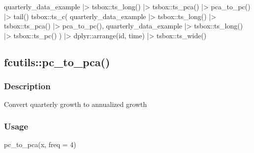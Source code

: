 \documentclass[
  letterpaper,
  DIV=11,
  numbers=noendperiod]{scrreport}
\newenvironment{Shaded}{\begin{snugshade}}{\end{snugshade}}
\newcommand{\AttributeTok}[1]{\textcolor[rgb]{0.40,0.45,0.13}{#1}}
\newcommand{\DecValTok}[1]{\textcolor[rgb]{0.68,0.00,0.00}{#1}}
\newcommand{\FunctionTok}[1]{\textcolor[rgb]{0.28,0.35,0.67}{#1}}
\newcommand{\NormalTok}[1]{\textcolor[rgb]{0.00,0.23,0.31}{#1}}
\newcommand{\SpecialCharTok}[1]{\textcolor[rgb]{0.37,0.37,0.37}{#1}}
\begin{document}
\begin{Shaded}
\begin{Highlighting}[]
\NormalTok{quarterly\_data\_example }\SpecialCharTok{|\textgreater{}}
\NormalTok{  tsbox}\SpecialCharTok{::}\FunctionTok{ts\_long}\NormalTok{() }\SpecialCharTok{|\textgreater{}}
\NormalTok{  tsbox}\SpecialCharTok{::}\FunctionTok{ts\_pca}\NormalTok{() }\SpecialCharTok{|\textgreater{}}
  \FunctionTok{pca\_to\_pc}\NormalTok{() }\SpecialCharTok{|\textgreater{}}
  \FunctionTok{tail}\NormalTok{()}
\NormalTok{tsbox}\SpecialCharTok{::}\FunctionTok{ts\_c}\NormalTok{(}
\NormalTok{  quarterly\_data\_example }\SpecialCharTok{|\textgreater{}}
\NormalTok{    tsbox}\SpecialCharTok{::}\FunctionTok{ts\_long}\NormalTok{() }\SpecialCharTok{|\textgreater{}}
\NormalTok{    tsbox}\SpecialCharTok{::}\FunctionTok{ts\_pca}\NormalTok{() }\SpecialCharTok{|\textgreater{}}
    \FunctionTok{pca\_to\_pc}\NormalTok{(),}
\NormalTok{  quarterly\_data\_example }\SpecialCharTok{|\textgreater{}}
\NormalTok{    tsbox}\SpecialCharTok{::}\FunctionTok{ts\_long}\NormalTok{() }\SpecialCharTok{|\textgreater{}}
\NormalTok{    tsbox}\SpecialCharTok{::}\FunctionTok{ts\_pc}\NormalTok{()}
\NormalTok{) }\SpecialCharTok{|\textgreater{}}
\NormalTok{  dplyr}\SpecialCharTok{::}\FunctionTok{arrange}\NormalTok{(id, time) }\SpecialCharTok{|\textgreater{}}
\NormalTok{  tsbox}\SpecialCharTok{::}\FunctionTok{ts\_wide}\NormalTok{()}
\end{Highlighting}
\end{Shaded}

\subsection{fcutils::pc\_to\_pca()}\label{fcutilspc_to_pca}

\subsubsection{Description}\label{description-46}

Convert quarterly growth to annualized growth

\subsubsection{Usage}\label{usage-46}

\begin{Shaded}
\begin{Highlighting}[]
\FunctionTok{pc\_to\_pca}\NormalTok{(x, }\AttributeTok{freq =} \DecValTok{4}\NormalTok{)}
\end{Highlighting}
\end{Shaded}
\end{document}
